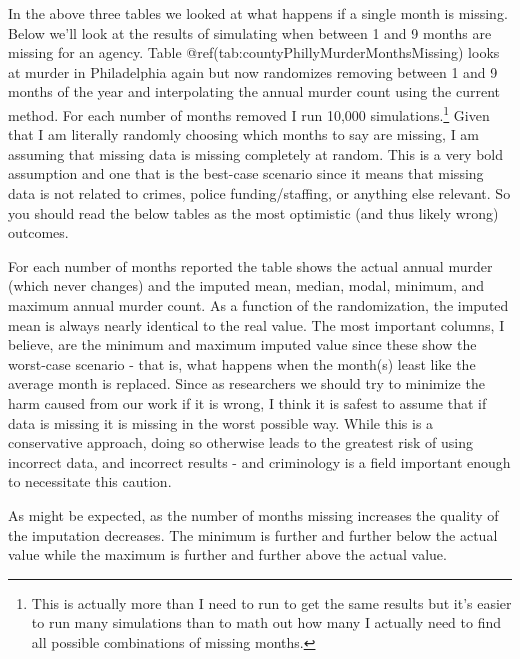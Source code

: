 \documentclass[
  12pt,
  openany]{book}
\begin{document}
In the above three tables we looked at what happens if a single month is missing. Below we'll look at the results of simulating when between 1 and 9 months are missing for an agency. Table @ref(tab:countyPhillyMurderMonthsMissing) looks at murder in Philadelphia again but now randomizes removing between 1 and 9 months of the year and interpolating the annual murder count using the current method. For each number of months removed I run 10,000 simulations.\footnote{This is actually more than I need to run to get the same results but it's easier to run many simulations than to math out how many I actually need to find all possible combinations of missing months.} Given that I am literally randomly choosing which months to say are missing, I am assuming that missing data is missing completely at random. This is a very bold assumption and one that is the best-case scenario since it means that missing data is not related to crimes, police funding/staffing, or anything else relevant. So you should read the below tables as the most optimistic (and thus likely wrong) outcomes.

For each number of months reported the table shows the actual annual murder (which never changes) and the imputed mean, median, modal, minimum, and maximum annual murder count. As a function of the randomization, the imputed mean is always nearly identical to the real value. The most important columns, I believe, are the minimum and maximum imputed value since these show the worst-case scenario - that is, what happens when the month(s) least like the average month is replaced. Since as researchers we should try to minimize the harm caused from our work if it is wrong, I think it is safest to assume that if data is missing it is missing in the worst possible way. While this is a conservative approach, doing so otherwise leads to the greatest risk of using incorrect data, and incorrect results - and criminology is a field important enough to necessitate this caution.

As might be expected, as the number of months missing increases the quality of the imputation decreases. The minimum is further and further below the actual value while the maximum is further and further above the actual value.
\end{document}
